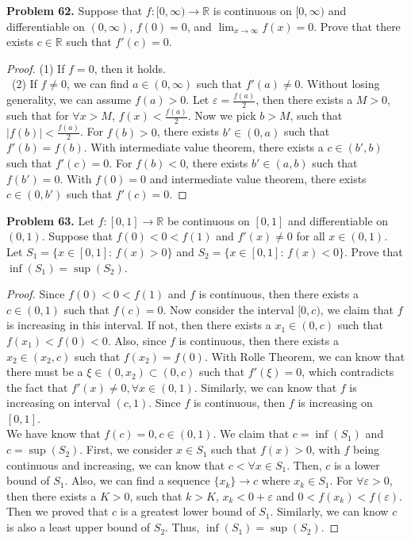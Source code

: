 \documentclass[12pt,leqno]{amsart}
\theoremstyle{definition}
\begin{document}
\medskip


\noindent
{\bf Problem 62.}
Suppose that $f:[0,\infty)\to\mathbb{R}$ is continuous on $[0,\infty)$ and differentiable on $(0,\infty)$, $f(0)=0$, and $\displaystyle\lim_{x\to\infty} f(x)=0$. Prove that there exists $c\in\mathbb{R}$ such that $f'(c)=0$.
\begin{proof}
(1) If $f = 0$, then it holds.\\
\hspace*{1em}\, (2) If $f\neq 0$, we can find $a\in (0,\infty)$ such that $f'(a)\neq 0$. Without losing generality, we can assume $f(a) > 0$. Let $\varepsilon = \frac{f(a)}{2}$, then there exists a $M > 0$, such that for $\forall x > M$, $f(x)<\frac{f(a)}{2}$. Now we pick $b > M$, such that $|f(b)|<\frac{f(a)}{2}$. For $f(b) > 0$, there exists $b'\in(0,a)$ such that $f'(b) = f(b)$. With intermediate value theorem, there exists a $c\in(b',b)$ such that $f'(c) = 0$. For $f(b) < 0$, there exists $b'\in(a,b)$ such that $f(b') = 0$. With $f(0) = 0$ and intermediate value theorem, there exists $c\in (0,b')$ such that $f'(c) = 0$.
\end{proof}

\medskip



\noindent
{\bf Problem 63.}
Let $f:[0,1]\to\mathbb{R}$ be continuous on $[0,1]$ and differentiable on $(0,1)$. Suppose that $f(0)<0<f(1)$ and $f'(x)\neq 0$ for all $x\in (0,1)$. Let
$S_1=\{x\in [0,1]:\,f(x)>0\}$ and $S_2=\{x\in [0,1]:\,   f(x)<0\}$. Prove that $\inf(S_1)=\sup(S_2)$.
\begin{proof}
Since $f(0)<0<f(1)$ and $f$ is continuous, then there exists a $c\in(0,1)$ such that $f(c)=0$. Now consider the interval $[0,c)$, we claim that $f$ is increasing in this interval. If not, then there exists a $x_1\in(0,c)$ such that $f(x_1)<f(0)<0$. Also, since $f$ is continuous, then there exists a $x_2\in(x_2,c)$ such that $f(x_2)=f(0)$. With Rolle Theorem, we can know that there must be a $\xi\in(0,x_2)\subset (0,c)$ such that $f'(\xi)=0$, which contradicts the fact that $f'(x)\neq 0, \forall x\in(0,1)$. Similarly, we can know that $f$ is increasing on interval $(c,1)$. Since $f$ is continuous, then $f$ is increasing on $[0,1]$. \\
\hspace*{1em}We have know that $f(c)=0, c\in(0,1)$. We claim that $c=\inf (S_1)$ and $c=\sup (S_2)$. First, we consider $x\in S_1$ such that $f(x)>0$, with $f$ being continuous and increasing, we can know that $c<\forall x\in S_1$. Then, $c$ is a lower bound of $S_1$. Also, we can find a sequence $\{x_k\}\rightarrow c$ where $x_k\in S_1$. For $\forall \varepsilon>0$, then there exists a $K>0$, such that $k>K$, $x_k<0+\varepsilon$ and $0<f(x_k)<f(\varepsilon)$. Then we proved that $c$ is a greatest lower bound of $S_1$. Similarly, we can know $c$ is also a least upper bound of $S_2$. Thus, $\inf(S_1)=\sup(S_2)$.
\end{proof}
\end{document}
